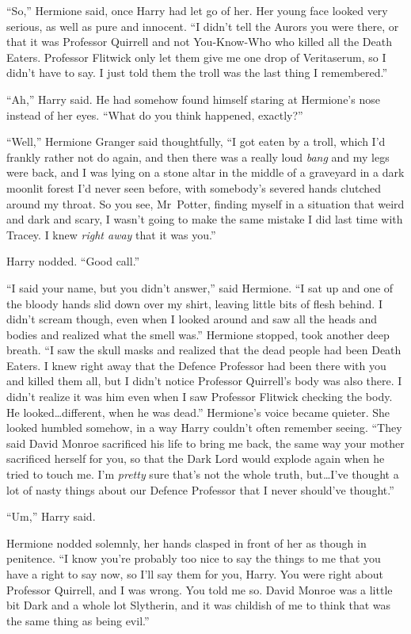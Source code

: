 “So,” Hermione said, once Harry had let go of her. Her young face looked very serious, as well as pure and innocent. “I didn’t tell the Aurors you were there, or that it was Professor Quirrell and not You-Know-Who who killed all the Death Eaters. Professor Flitwick only let them give me one drop of Veritaserum, so I didn’t have to say. I just told them the troll was the last thing I remembered.”

“Ah,” Harry said. He had somehow found himself staring at Hermione’s nose instead of her eyes. “What do you think happened, exactly?”

“Well,” Hermione Granger said thoughtfully, “I got eaten by a troll, which I’d frankly rather not do again, and then there was a really loud \emph{bang} and my legs were back, and I was lying on a stone altar in the middle of a graveyard in a dark moonlit forest I’d never seen before, with somebody’s severed hands clutched around my throat. So you see, Mr~Potter, finding myself in a situation that weird and dark and scary, I wasn’t going to make the same mistake I did last time with Tracey. I knew \emph{right away} that it was you.”

Harry nodded. “Good call.”

“I said your name, but you didn’t answer,” said Hermione. “I sat up and one of the bloody hands slid down over my shirt, leaving little bits of flesh behind. I didn’t scream though, even when I looked around and saw all the heads and bodies and realized what the smell was.” Hermione stopped, took another deep breath. “I saw the skull masks and realized that the dead people had been Death Eaters. I knew right away that the Defence Professor had been there with you and killed them all, but I didn’t notice Professor Quirrell’s body was also there. I didn’t realize it was him even when I saw Professor Flitwick checking the body. He looked…different, when he was dead.” Hermione’s voice became quieter. She looked humbled somehow, in a way Harry couldn’t often remember seeing. “They said David Monroe sacrificed his life to bring me back, the same way your mother sacrificed herself for you, so that the Dark Lord would explode again when he tried to touch me. I’m \emph{pretty} sure that’s not the whole truth, but…I’ve thought a lot of nasty things about our Defence Professor that I never should’ve thought.”

“Um,” Harry said.

Hermione nodded solemnly, her hands clasped in front of her as though in penitence. “I know you’re probably too nice to say the things to me that you have a right to say now, so I’ll say them for you, Harry. You were right about Professor Quirrell, and I was wrong. You told me so. David Monroe was a little bit Dark and a whole lot Slytherin, and it was childish of me to think that was the same thing as being evil.”


